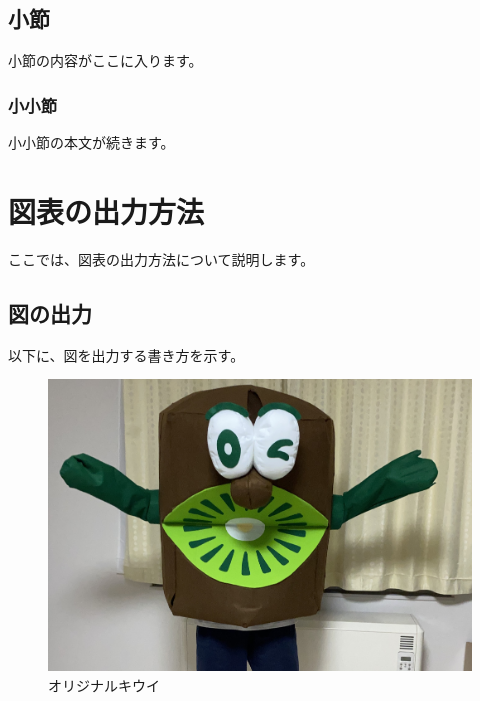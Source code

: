     \subsection{小節}

    小節の内容がここに入ります。

        \subsubsection{小小節}

        小小節の本文が続きます。

\section{図表の出力方法}

ここでは、図表の出力方法について説明します。

\subsection{図の出力}

以下に、図を出力する書き方を示す。

\begin{figure}[H]
    \vspace{0mm}
    \begin{center}
        \includegraphics[width=0.8\hsize]{image/1/1.1.jpg}
        \caption{オリジナルキウイ}\label{fig:orikiui}
    \end{center}
    \vspace{0mm}
\end{figure}

\newpage

